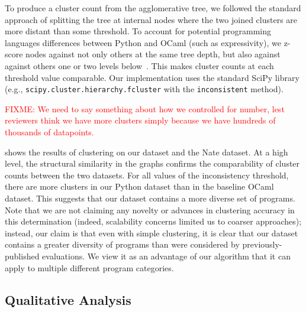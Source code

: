 \documentclass[conference]{IEEEtran}
\newcommand{\fixme}[1]{\textcolor{red}{FIXME: #1}}
\newcommand\lt[1]{{\lstinline|#1|}}
\begin{document}
To produce a cluster count from the agglomerative tree, we followed the
standard approach of splitting the tree at internal nodes where the two
joined clusters are more distant than some threshold. To account for
potential programming languages differences between Python and OCaml (such
as expressivity), we z-score nodes against not only others at the same tree
depth, but also against against others one or two levels
below~\cite{inconsistent}. This makes cluster counts at each threshold
value comparable. Our implementation uses the standard
SciPy library (e.g., \lt{scipy.cluster.hierarchy.fcluster} with the
\lt{inconsistent} method).

\fixme{We need to say something about how we controlled for number, lest
reviewers think we have more clusters simply because we have hundreds of
thousands of datapoints.}

 shows the results of clustering on our dataset and the
Nate dataset. At a high level, the structural similarity in the graphs
confirms the comparability of cluster counts between the two datasets.  For
all values of the inconsistency threshold, there are more clusters in our
Python dataset than in the baseline OCaml dataset. This suggests that our
dataset contains a more diverse set of programs. Note that we are not
claiming any novelty or advances in clustering accuracy in this
determination (indeed, scalability concerns limited us to coarser
approaches); instead, our claim is that even with simple clustering,
it is clear that our dataset contains a greater diversity of programs than
were considered by previously-published evaluations.
We view it as an advantage of our algorithm that it can apply to multiple
different program categories.





\subsection{Qualitative Analysis}
\end{document}
